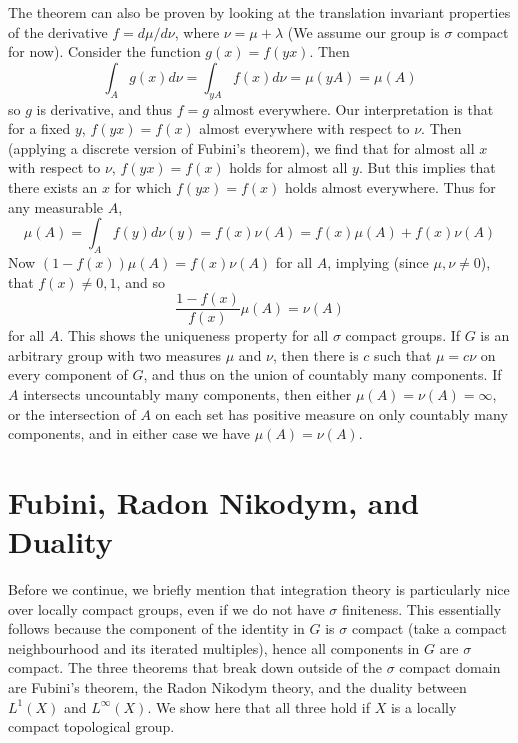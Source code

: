 The theorem can also be proven by looking at the translation invariant properties of the derivative $f = d\mu/d\nu$, where $\nu = \mu + \lambda$ (We assume our group is $\sigma$ compact for now). Consider the function $g(x) = f(yx)$. Then
%
\[ \int_A g(x) d\nu = \int_{yA} f(x) d\nu = \mu(yA) = \mu(A) \]
%
so $g$ is derivative, and thus $f = g$ almost everywhere. Our interpretation is that for a fixed $y$, $f(yx) = f(x)$ almost everywhere with respect to $\nu$. Then (applying a discrete version of Fubini's theorem), we find that for almost all $x$ with respect to $\nu$, $f(yx) = f(x)$ holds for almost all $y$. But this implies that there exists an $x$ for which $f(yx) = f(x)$ holds almost everywhere. Thus for any measurable $A$,
%
\[ \mu(A) = \int_A f(y) d\nu(y) = f(x) \nu(A) = f(x) \mu(A) + f(x) \nu(A) \]
%
Now $(1 - f(x)) \mu(A) = f(x) \nu(A)$ for all $A$, implying (since $\mu, \nu \neq 0$), that $f(x) \neq 0,1$, and so
%
\[ \frac{1-f(x)}{f(x)} \mu(A) = \nu(A) \]
%
for all $A$. This shows the uniqueness property for all $\sigma$ compact groups. If $G$ is an arbitrary group with two measures $\mu$ and $\nu$, then there is $c$ such that $\mu = c \nu$ on every component of $G$, and thus on the union of countably many components. If $A$ intersects uncountably many components, then either $\mu(A) = \nu(A) = \infty$, or the intersection of $A$ on each set has positive measure on only countably many components, and in either case we have $\mu(A) = \nu(A)$.

\section{Fubini, Radon Nikodym, and Duality}

Before we continue, we briefly mention that integration theory is particularly nice over locally compact groups, even if we do not have $\sigma$ finiteness. This essentially follows because the component of the identity in $G$ is $\sigma$ compact (take a compact neighbourhood and its iterated multiples), hence all components in $G$ are $\sigma$ compact. The three theorems that break down outside of the $\sigma$ compact domain are Fubini's theorem, the Radon Nikodym theory, and the duality between $L^1(X)$ and $L^\infty(X)$. We show here that all three hold if $X$ is a locally compact topological group.

